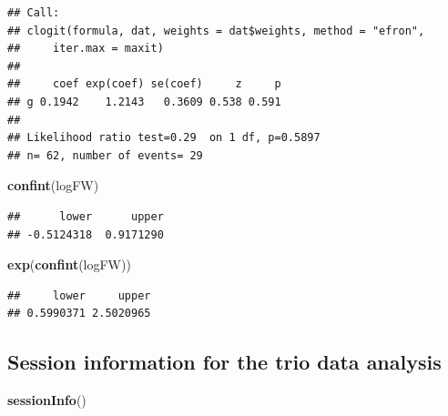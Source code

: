 \documentclass[
]{article}
\newenvironment{Shaded}{\begin{snugshade}}{\end{snugshade}}
\newcommand{\FunctionTok}[1]{\textcolor[rgb]{0.13,0.29,0.53}{\textbf{#1}}}
\newcommand{\NormalTok}[1]{#1}
\begin{document}
\begin{verbatim}
## Call:
## clogit(formula, dat, weights = dat$weights, method = "efron", 
##     iter.max = maxit)
## 
##     coef exp(coef) se(coef)     z     p
## g 0.1942    1.2143   0.3609 0.538 0.591
## 
## Likelihood ratio test=0.29  on 1 df, p=0.5897
## n= 62, number of events= 29
\end{verbatim}

\begin{Shaded}
\begin{Highlighting}[]
\FunctionTok{confint}\NormalTok{(logFW)}
\end{Highlighting}
\end{Shaded}

\begin{verbatim}
##      lower      upper 
## -0.5124318  0.9171290
\end{verbatim}

\begin{Shaded}
\begin{Highlighting}[]
\FunctionTok{exp}\NormalTok{(}\FunctionTok{confint}\NormalTok{(logFW))}
\end{Highlighting}
\end{Shaded}

\begin{verbatim}
##     lower     upper 
## 0.5990371 2.5020965
\end{verbatim}

\subsection{Session information for the trio data
analysis}\label{session-information-for-the-trio-data-analysis}

\begin{Shaded}
\begin{Highlighting}[]
\FunctionTok{sessionInfo}\NormalTok{()}
\end{Highlighting}
\end{Shaded}
\end{document}

